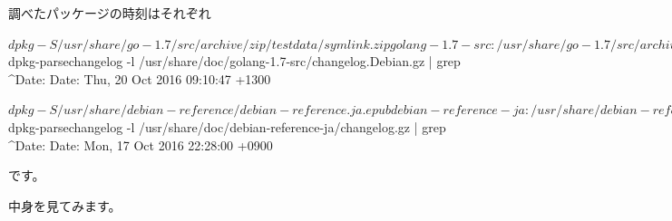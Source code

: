 \documentclass[mingoth,a4paper]{jsarticle}
\begin{document}
調べたパッケージの時刻はそれぞれ
\begin{commandline}
$ dpkg -S /usr/share/go-1.7/src/archive/zip/testdata/symlink.zip
golang-1.7-src: /usr/share/go-1.7/src/archive/zip/testdata/symlink.zip
$ dpkg-parsechangelog -l /usr/share/doc/golang-1.7-src/changelog.Debian.gz | grep ^Date:
Date: Thu, 20 Oct 2016 09:10:47 +1300
\end{commandline}

\begin{commandline}
$ dpkg -S /usr/share/debian-reference/debian-reference.ja.epub
debian-reference-ja: /usr/share/debian-reference/debian-reference.ja.epub
$ dpkg-parsechangelog -l /usr/share/doc/debian-reference-ja/changelog.gz | grep ^Date:
Date: Mon, 17 Oct 2016 22:28:00 +0900
\end{commandline}
です。

中身を見てみます。

\end{document}
